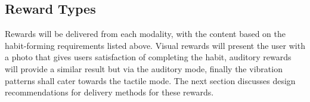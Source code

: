 \subsection{Reward Types}
Rewards will be delivered from each modality, with the content based on the habit-forming requirements listed above. Visual rewards will present the user with a photo that gives users satisfaction of completing the habit, auditory rewards will provide a similar result but via the auditory mode, finally the vibration patterns shall cater towards the tactile mode. The next section discusses design recommendations for delivery methods for these rewards.

